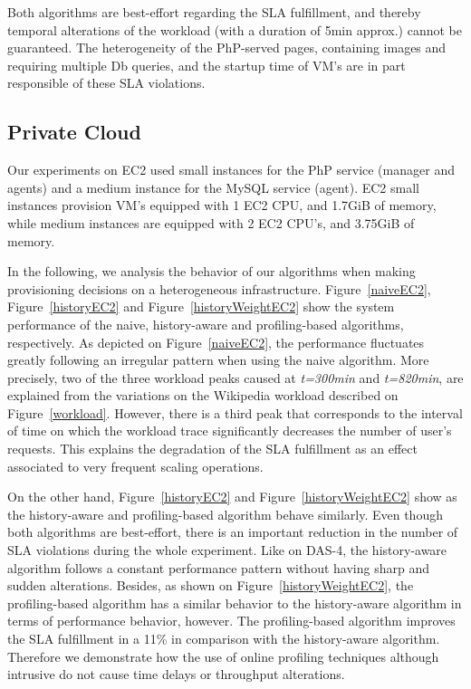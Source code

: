 Both algorithms are best-effort regarding the SLA fulfillment, and thereby temporal alterations of the workload (with a duration of 5min approx.) cannot be guaranteed. The heterogeneity of the PhP-served pages, containing images and requiring multiple Db queries, and the startup time of VM's are in part responsible of these SLA violations. 




\subsection{Private Cloud}

Our experiments on EC2 used small instances for the PhP service (manager and agents) and  a medium instance for the MySQL service (agent). EC2 small instances provision VM's equipped with 1 EC2 CPU, and 1.7GiB of memory, while medium instances are equipped with 2 EC2 CPU's, and 3.75GiB of memory.

In the following, we analysis the behavior of our algorithms when making provisioning decisions on a heterogeneous infrastructure. Figure~\ref{naiveEC2}, Figure~\ref{historyEC2} and Figure~\ref{historyWeightEC2} show the system performance of the naive, history-aware and profiling-based algorithms, respectively. As depicted on Figure~\ref{naiveEC2}, the performance fluctuates greatly following an irregular pattern when using the naive algorithm. More precisely, two of the three workload peaks caused at \emph{t=300min} and \emph{t=820min}, are explained from the variations on the Wikipedia workload described on Figure~\ref{workload}. However, there is a third peak that corresponds to the interval of time on which the workload trace significantly decreases the number of user's requests. This explains the degradation of the SLA fulfillment as an effect associated to very frequent scaling operations. 

On the other hand, Figure~\ref{historyEC2} and Figure~\ref{historyWeightEC2} show as the history-aware and profiling-based algorithm behave similarly. Even though both algorithms are best-effort, there is an important reduction in the number of SLA violations during the whole experiment. Like on DAS-4, the history-aware algorithm follows a constant performance pattern without having sharp and sudden alterations. Besides, as shown on Figure~\ref{historyWeightEC2}, the profiling-based algorithm has a similar behavior to the history-aware algorithm in terms of performance behavior, however. The profiling-based algorithm improves the SLA fulfillment in a 11\% in comparison with the history-aware algorithm. Therefore we demonstrate how the use of online profiling techniques although intrusive do not cause time delays or throughput alterations. 

